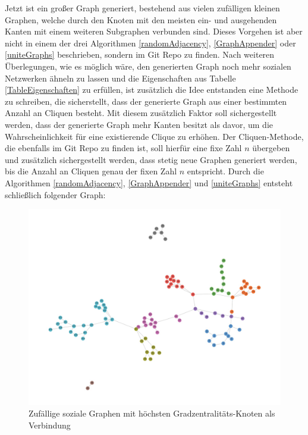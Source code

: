 \newpage
Jetzt ist ein großer Graph generiert, bestehend aus vielen zufälligen kleinen Graphen, welche durch den Knoten mit den meisten ein- und ausgehenden Kanten mit einem weiteren Subgraphen verbunden sind. Dieses Vorgehen ist aber nicht in einem der drei Algorithmen \ref{randomAdjacency}, \ref{GraphAppender} oder \ref{uniteGraphs} beschrieben, sondern im Git Repo \cite{TZ} zu finden. 
Nach weiteren Überlegungen, wie es möglich wäre, den generierten Graph noch mehr sozialen Netzwerken ähneln zu lassen und die Eigenschaften aus Tabelle \ref{TableEigenschaften} zu erfüllen, ist zusätzlich die Idee entstanden eine Methode zu schreiben, die sicherstellt, dass der generierte Graph aus einer bestimmten Anzahl an Cliquen besteht. Mit diesem zusätzlich Faktor soll sichergestellt werden, dass der generierte Graph mehr Kanten besitzt als davor, um die Wahrscheinlichkeit für eine existierende Clique zu erhöhen. Der Cliquen-Methode, die ebenfalls im Git Repo \cite{TZ} zu finden ist, soll hierfür eine fixe Zahl $n$ übergeben und zusätzlich sichergestellt werden, dass stetig neue Graphen generiert werden, bis die Anzahl an Cliquen genau der fixen Zahl $n$ entspricht.
Durch die Algorithmen \ref{randomAdjacency}, \ref{GraphAppender} und \ref{uniteGraphs} entsteht schließlich folgender Graph:

\FloatBarrier
\begin{figure}[h!]
    \centering
    \hspace*{-1.5cm}
    \includegraphics[width=1.0\textwidth]{Graphics/NearSocialNetwork.jpg}
    \caption{Zufällige soziale Graphen mit höchsten Gradzentralitäts-Knoten als Verbindung }
    \label{NearSozialerGraph}
\end{figure}

